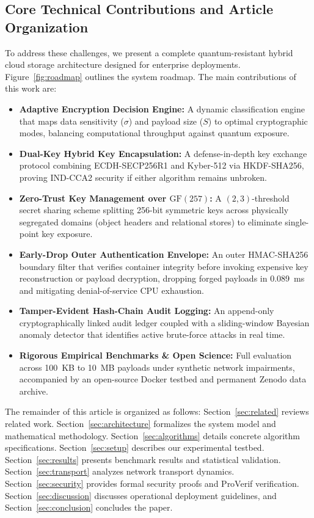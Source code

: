 \documentclass[sn-mathphys,Numbered]{sn-jnl}%
\theoremstyle{thmstyleone}%
\theoremstyle{thmstyletwo}%
\theoremstyle{thmstylethree}%
\begin{document}
\subsection{\textbf{Core Technical Contributions and Article Organization}}
To address these challenges, we present a complete quantum-resistant hybrid cloud storage architecture designed for enterprise deployments. Figure~\ref{fig:roadmap} outlines the system roadmap. The main contributions of this work are:
\begin{itemize}
    \item \textbf{Adaptive Encryption Decision Engine:} A dynamic classification engine that maps data sensitivity ($\sigma$) and payload size ($S$) to optimal cryptographic modes, balancing computational throughput against quantum exposure.
    \item \textbf{Dual-Key Hybrid Key Encapsulation:} A defense-in-depth key exchange protocol combining ECDH-SECP256R1 and Kyber-512 via HKDF-SHA256, proving IND-CCA2 security if either algorithm remains unbroken.
    \item \textbf{Zero-Trust Key Management over $\text{GF}(257)$:} A $(2,3)$-threshold secret sharing scheme splitting 256-bit symmetric keys across physically segregated domains (object headers and relational stores) to eliminate single-point key exposure.
    \item \textbf{Early-Drop Outer Authentication Envelope:} An outer HMAC-SHA256 boundary filter that verifies container integrity before invoking expensive key reconstruction or payload decryption, dropping forged payloads in 0.089~ms and mitigating denial-of-service CPU exhaustion.
    \item \textbf{Tamper-Evident Hash-Chain Audit Logging:} An append-only cryptographically linked audit ledger coupled with a sliding-window Bayesian anomaly detector that identifies active brute-force attacks in real time.
    \item \textbf{Rigorous Empirical Benchmarks \& Open Science:} Full evaluation across 100~KB to 10~MB payloads under synthetic network impairments, accompanied by an open-source Docker testbed and permanent Zenodo data archive.
\end{itemize}

The remainder of this article is organized as follows: Section~\ref{sec:related} reviews related work. Section~\ref{sec:architecture} formalizes the system model and mathematical methodology. Section~\ref{sec:algorithms} details concrete algorithm specifications. Section~\ref{sec:setup} describes our experimental testbed. Section~\ref{sec:results} presents benchmark results and statistical validation. Section~\ref{sec:transport} analyzes network transport dynamics. Section~\ref{sec:security} provides formal security proofs and ProVerif verification. Section~\ref{sec:discussion} discusses operational deployment guidelines, and Section~\ref{sec:conclusion} concludes the paper.
\end{document}
